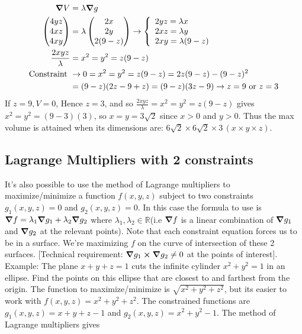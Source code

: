 \documentclass{article}
\newcommand{\nn}{\leavevmode \newline \newline} %
\newcommand{\R}{\mathbb{R}} %
\numberwithin{equation}{subsection} %
\begin{document}
\begin{equation}
    \begin{split}
        \grad V &= \lambda \grad g \\
        \begin{pmatrix}
            4yz \\ 4xz \\ 4xy
        \end{pmatrix}
        &= \lambda
        \begin{pmatrix}
            2x \\ 2y \\ 2(9-z)
        \end{pmatrix}
        \to
        \left\{
        \begin{array}{ll}
            2yz = \lambda x \\
            2xz = \lambda y \\
            2xy = \lambda (9-z)
        \end{array}
        \right.
        \\
        \frac{2xyz}{\lambda} &= x^2 = y^2 = z(9-z)
        \\
        \text{Constraint } &\to 0=x^2=y^2=z(9-z)=2z(9-z)-(9-z)^2 \\
        &= (9-z)(2z-9+z) = (9-z)(3z-9) \to z = 9 \text{ or } z=3
    \end{split}
\end{equation}
If $z=9,V=0$, Hence $z=3$, and so $\frac{2xyz}{\lambda} = x^2 = y^2 = z(9-z)$ gives $x^2=y^2=(9-3)(3)$, so $x=y=3\sqrt{2}$ since $x>0$ and $y>0$. Thus the max volume is attained when its dimensions are: $6\sqrt{2} \times 6\sqrt{2} \times 3 \, (x \times y \times z)$.
\subsection{Lagrange Multipliers with 2 constraints}
It's also possible to use the method of Lagrange multipliers to maximize/minimize a function $f(x,y,z)$ subject to two constraints $g_1(x,y,z)=0$ and $g_2(x,y,z)=0$. In this case the formula to use is $\grad f=\lambda_1 \grad g_1 + \lambda_2 \grad g_2$ where $\lambda_1, \lambda_2 \in \R$(i.e $\grad f$ is a linear combination of $\grad g_1$ and $\grad g_2$ at the relevant points). Note that each constraint equation forces us to be in a surface. We're maximizing $f$ on the curve of intersection of these 2 surfaces. [Technical requirement: $\grad g_1 \cross \grad g_2 \neq 0$ at the points of interest].\nn
Example: The plane $x+y+z=1$ cuts the infinite cylinder $x^2+y^2=1$ in an ellipse. Find the points on this ellipse that are closest to and farthest from the origin. The function to maximize/minimize is $\sqrt{x^2+y^2+z^2}$, but its easier to work with $f(x,y,z)=x^2+y^2+z^2$. The constrained functions are $g_1(x,y,z)=x+y+z-1$ and $g_2(x,y,z)=x^2+y^2-1$. The method of Lagrange multipliers gives
\end{document}
